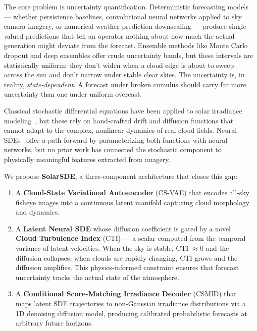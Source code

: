 \documentclass{article}
\begin{document}
The core problem is uncertainty quantification. Deterministic forecasting models --- whether persistence baselines, convolutional neural networks applied to sky camera imagery, or numerical weather prediction downscaling --- produce single-valued predictions that tell an operator nothing about how much the actual generation might deviate from the forecast. Ensemble methods like Monte Carlo dropout and deep ensembles offer crude uncertainty bands, but these intervals are statistically uniform: they don't widen when a cloud edge is about to sweep across the sun and don't narrow under stable clear skies. The uncertainty is, in reality, \emph{state-dependent}. A forecast under broken cumulus should carry far more uncertainty than one under uniform overcast.

Classical stochastic differential equations have been applied to solar irradiance modeling~\citep{iversen2014, jongaramrungruang2018}, but these rely on hand-crafted drift and diffusion functions that cannot adapt to the complex, nonlinear dynamics of real cloud fields. Neural SDEs~\citep{li2020scalable, kidger2021neural} offer a path forward by parameterizing both functions with neural networks, but no prior work has connected the stochastic component to physically meaningful features extracted from imagery.

We propose \textbf{SolarSDE}, a three-component architecture that closes this gap:

\begin{enumerate}
    \item A \textbf{Cloud-State Variational Autoencoder} (CS-VAE) that encodes all-sky fisheye images into a continuous latent manifold capturing cloud morphology and dynamics.
    \item A \textbf{Latent Neural SDE} whose diffusion coefficient is gated by a novel \textbf{Cloud Turbulence Index} (CTI) --- a scalar computed from the temporal variance of latent velocities. When the sky is stable, CTI $\approx 0$ and the diffusion collapses; when clouds are rapidly changing, CTI grows and the diffusion amplifies. This physics-informed constraint ensures that forecast uncertainty tracks the actual state of the atmosphere.
    \item A \textbf{Conditional Score-Matching Irradiance Decoder} (CSMID) that maps latent SDE trajectories to non-Gaussian irradiance distributions via a 1D denoising diffusion model, producing calibrated probabilistic forecasts at arbitrary future horizons.
\end{enumerate}
\end{document}
